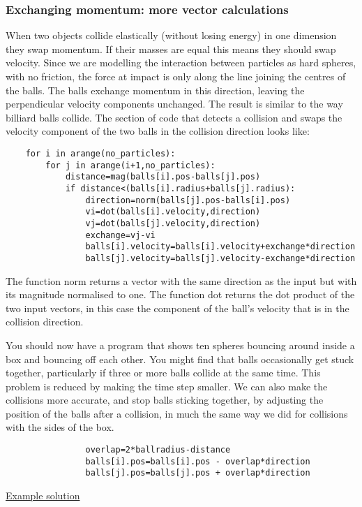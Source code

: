 \documentclass[a4paper]{letter}
\begin{document}
\subsubsection{Exchanging momentum: more vector calculations}
When two objects collide elastically (without losing energy) in one dimension they swap momentum. 
If their masses are equal this means they should swap velocity. 
Since we are modelling the interaction between particles as hard spheres, 
with no friction, the force at impact is only along the line joining the centres of the balls. 
The balls exchange momentum in this direction, 
leaving the perpendicular velocity components unchanged. 
The result is similar to the way billiard balls collide.
The section of code that detects a collision and swaps the velocity component of the two balls 
in the collision direction looks like:
{\color{code}\begin{verbatim}
    for i in arange(no_particles): 
        for j in arange(i+1,no_particles): 
            distance=mag(balls[i].pos-balls[j].pos) 
            if distance<(balls[i].radius+balls[j].radius): 
                direction=norm(balls[j].pos-balls[i].pos) 
                vi=dot(balls[i].velocity,direction) 
                vj=dot(balls[j].velocity,direction) 
                exchange=vj-vi 
                balls[i].velocity=balls[i].velocity+exchange*direction 
                balls[j].velocity=balls[j].velocity-exchange*direction 
\end{verbatim}}
The function {\color{code}norm} returns a vector with the same direction as the input 
but with its magnitude normalised to one. 
The function {\color{code}dot} returns the dot product of the two input vectors, 
in this case the component of the ball's velocity that is in the collision direction. 

You should now have a program that shows ten spheres bouncing around inside a box 
and bouncing off each other. 
You might find that balls occasionally get stuck together, 
particularly if three or more balls collide at the same time. 
This problem is reduced by making the time step smaller. 
We can also make the collisions more accurate, and stop balls sticking together, 
by adjusting the position of the balls after a collision, in much the same way we did 
for collisions with the sides of the box. 
{\color{code}\begin{verbatim}
                overlap=2*ballradius-distance 
                balls[i].pos=balls[i].pos - overlap*direction 
                balls[j].pos=balls[j].pos + overlap*direction 
\end{verbatim}}
\href{manybounce1.html}{Example solution} 
\end{document}
